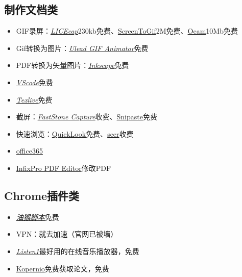 \documentclass[UTF8,oneside]{ctexbook}
\begin{document}
\subsection{制作文档类}
\begin{itemize}
	\item GIF录屏：\underline{\textit{\href{https://www.cockos.com/licecap/}{LICEcap}}}\quad 230kb免费、\href{https://www.screentogif.com/?l=zh_cn}{ScreenToGif}\quad 2M免费、\href{https://ocam.en.softonic.com}{Ocam}\quad 10Mb免费
	\item Gif转换为图片：\underline{\textit{\href{https://ulead-gif-animator.jaleco.com}{Ulead GIF Animator}}}\quad 免费
	\item PDF转换为矢量图片：\underline{\textit{\href{https://inkscape.org}{Inkscape}}}\quad 免费
	\item \underline{\textit{\href{https://code.visualstudio.com}{VScode}}}\quad 免费
	\item \underline{\textit{\href{https://mirrors.tuna.tsinghua.edu.cn/CTAN/systems/texlive/Images/}{Texlive}}}\quad 免费
	\item 截屏：\underline{\textit{\href{http://www.faststone.org/FSCaptureDetail.htm}{FastStone Capture}}}\quad 收费、\href{https://www.snipaste.com}{Snipaste}\quad 免费
	\item 快速浏览：\href{https://pooi.moe/QuickLook/}{QuickLook}\quad 免费、\href{http://1218.io}{seer}\quad 收费
	\item \href{https://otp.landian.vip/zh-cn/}{office365}
	\item \href{http://www.dayanzai.me/infixpro-pdf-editor.html}{InfixPro PDF Editor}\quad 修改PDF
\end{itemize}

\subsection{Chrome插件类}
\begin{itemize}
	\item \underline{\textit{\href{https://greasyfork.org/zh-CN}{油猴脚本}}}\quad 免费
	\item VPN：就去加速（官网已被墙）
	\item \underline{\textit{\href{http://listen1.github.io/listen1/}{Listen1}}}\quad 最好用的在线音乐播放器，免费
	\item \href{https://kopernio.com}{Kopernio}\quad 免费获取论文，免费
\end{itemize}
\end{document}
